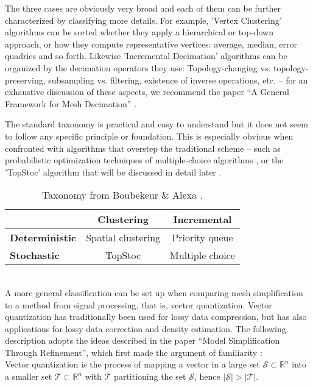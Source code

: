 The three cases are obviously very broad and each of them can be further characterized by classifying more details.
For example, 'Vertex Clustering' algorithms can be sorted whether they apply a hierarchical or top-down approach, or how they compute representative vertices: average, median, error quadrics and so forth.
Likewise 'Incremental Decimation' algorithms can be organized by the decimation operators they use: Topology-changing vs. topology-preserving, subsampling vs. filtering, existence of inverse operations, etc. -- for an exhaustive discussion of these aspects, we recommend the paper ``A General Framework for Mesh Decimation'' \citep[cf.][]{Kobbelt1998}.

The standard taxonomy is practical and easy to understand but it does not seem to follow any specific principle or foundation.
This is especially obvious when confronted with algorithms that overstep the traditional scheme -- such as probabilistic optimization techniques of multiple-choice algorithms \citep[cf.][]{Wu2002}, or the 'TopStoc' algorithm that will be discussed in detail later \citep[][cf.]{Boubekeur2009}.
\begin{table}[htpb]
\medskip
\setlength{\tabcolsep}{15pt}
\renewcommand{\arraystretch}{1.5}
   \centering
\begin{tabular}{ l || c | c } \centering
    & \textbf{Clustering} & \textbf{Incremental} \\ \hline \hline
  \textbf{Deterministic} & Spatial clustering & Priority queue \\
  \textbf{Stochastic} & TopStoc & Multiple choice \\
\end{tabular}
   \label{tab:taxonomies} \bigskip
   \caption{Taxonomy from Boubekeur \& Alexa \citep[p.2]{Boubekeur2009}.}
\end{table}\\
A more general classification can be set up when comparing mesh simplification to a method from signal processing, that is, vector quantization.
Vector quantization has traditionally been used for lossy data compression, but has also applications for lossy data correction and density estimation.
The following description adopts the ideas described in the paper ``Model Simplification Through Refinement'', which first made the argument of familiarity \citep[][cf. pp.221-222]{Brodsky2000}:\\
Vector quantization is the process of mapping a vector in a large set $\mathcal{S} \subset \mathbb{R}^{n}$ into a smaller set $\mathcal{T} \subset \mathbb{R}^{n}$ with $\mathcal{T}$ partitioning the set $\mathcal{S}$, hence $|\mathcal{S}| > |\mathcal{T}|$.
